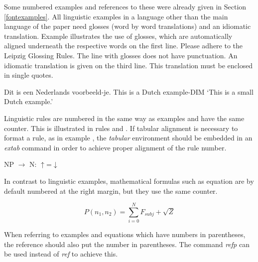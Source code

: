 \documentclass[11pt,twoside]{article}
\begin{document}
Some numbered examples and references to these were already given in Section \ref{fontexamples}.
All linguistic examples in a language other than the main language of the paper need glosses (word by word translations) and an idiomatic translation.
Example  illustrates the use of glosses, which are automatically aligned underneath the respective words on the first line.
Please adhere to the Leipzig Glossing Rules.
The line with glosses does not have punctuation.
An idiomatic translation is given on the third line.
This translation must be enclosed in single quotes.

\begin{example} \label{dutch}
\gll Dit is een Nederlands voorbeeld-je.
This is a Dutch example-DIM
\glt `This is a small Dutch example.' \glend
\end{example}

Linguistic rules are numbered in the same way as examples and have the same counter.
This is illustrated in rules  and .
If tabular alignment is necessary to format a rule, as in example , the \emph{tabular} environment should be embedded in an \emph{extab} command in order to achieve proper alignment of the rule number.

\begin{examples} 
 \item \label{ex:mweiness:NP-rule} NP $\rightarrow$ N: $\uparrow$=$\downarrow$ \\

 \item \label{ex:mweiness:furule}
\end{examples}

In contrast to linguistic examples, mathematical formulas such as equation  are by default numbered at the right margin, but they use the same counter.

\begin{equation} \label{eq:prob}
P(n_1, n_2) =  \sum_{i=0}^{N} F_{subj} + \sqrt{Z}
\end{equation}

When referring to examples and equations which have numbers in parentheses, the reference should also put the number in parentheses.
The command \emph{refp} can be used instead of \emph{ref} to achieve this.
\end{document}
